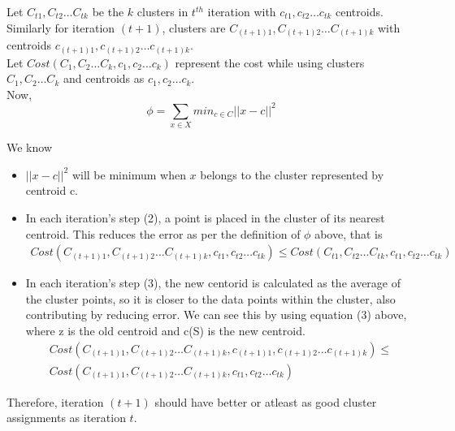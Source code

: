 \documentclass[11pt]{article}
\begin{document}
{Let $C_{t1}, C_{t2} \hdots C_{tk}$ be the $k$ clusters in $t^{th}$ iteration with $c_{t1}, c_{t2} \hdots c_{tk}$ centroids. Similarly for iteration $(t+1)$, clusters are $C_{(t+1)1}, C_{(t+1)2} \hdots C_{(t+1)k}$ with centroids $c_{(t+1)1}, c_{(t+1)2} \hdots c_{(t+1)k}$. \\

Let $Cost (C_1, C_2 \hdots C_k, c_1, c_2 \hdots c_k)$ represent the cost while using clusters $C_1, C_2 \hdots C_k$ and centroids as $c_1, c_2 \hdots c_k$.\\

Now, $$\phi = \sum_{x \in X} min_{c \in C} ||x-c||^2$$

We know 
\begin{itemize}
\item $||x-c||^2$ will be minimum when $x$ belongs to the cluster represented by centroid c.
\item In each iteration's step (2), a point is placed in the cluster of its nearest centroid. This reduces the error as per the definition of $\phi$ above, that is
\begin{equation}\label{eq:simple}
\begin{aligned}
Cost (C_{(t+1)1}, C_{(t+1)2} \hdots C_{(t+1)k}, c_{t1}, c_{t2} \hdots c_{tk}) \leq Cost (C_{t1}, C_{t2} \hdots C_{tk}, c_{t1}, c_{t2} \hdots c_{tk})
\end{aligned}
\end{equation}

\item In each iteration's step (3), the new centorid is calculated as the average of the cluster points, so it is closer to the data points within the cluster, also contributing by reducing error. We can see this by using equation (3) above, where z is the old centroid and c(S) is the new centroid.\\
\begin{equation}\label{eq:simple}
\begin{aligned}
Cost (C_{(t+1)1}, C_{(t+1)2} \hdots C_{(t+1)k}, c_{(t+1)1}, c_{(t+1)2} \hdots c_{(t+1)k}) \leq \\
Cost (C_{(t+1)1}, C_{(t+1)2} \hdots C_{(t+1)k}, c_{t1}, c_{t2} \hdots c_{tk})
\end{aligned}
\end{equation}

\end{itemize}

Therefore, iteration $(t+1)$ should have better or atleast as good cluster assignments as iteration $t$. \\

}
\end{document}
